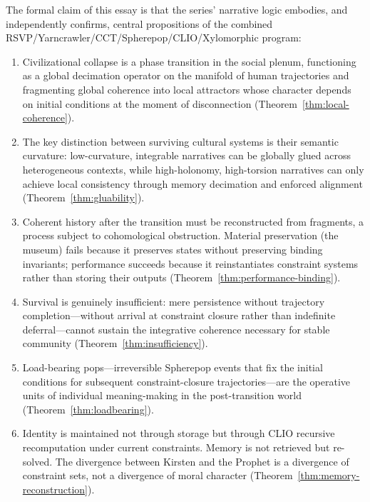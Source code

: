 \documentclass[12pt, oneside]{article}
\theoremstyle{plain}
\theoremstyle{definition}
\theoremstyle{remark}
\begin{document}
The formal claim of this essay is that the series' narrative logic
embodies, and independently confirms, central propositions of the
combined RSVP/Yarncrawler/CCT/Spherepop/CLIO/Xylomorphic program:

\begin{enumerate}
  \item Civilizational collapse is a phase transition in the social
  plenum, functioning as a global decimation operator on the
  manifold of human trajectories and fragmenting global coherence
  into local attractors whose character depends on initial conditions
  at the moment of disconnection (Theorem~\ref{thm:local-coherence}).

  \item The key distinction between surviving cultural systems is
  their semantic curvature: low-curvature, integrable narratives
  can be globally glued across heterogeneous contexts, while
  high-holonomy, high-torsion narratives can only achieve local
  consistency through memory decimation and enforced alignment
  (Theorem~\ref{thm:gluability}).

  \item Coherent history after the transition must be reconstructed
  from fragments, a process subject to cohomological obstruction.
  Material preservation (the museum) fails because it preserves
  states without preserving binding invariants; performance
  succeeds because it reinstantiates constraint systems rather than
  storing their outputs (Theorem~\ref{thm:performance-binding}).

  \item Survival is genuinely insufficient: mere persistence without
  trajectory completion---without arrival at constraint closure
  rather than indefinite deferral---cannot sustain the integrative
  coherence necessary for stable community
  (Theorem~\ref{thm:insufficiency}).

  \item Load-bearing pops---irreversible Spherepop events that fix
  the initial conditions for subsequent constraint-closure
  trajectories---are the operative units of individual meaning-making
  in the post-transition world (Theorem~\ref{thm:loadbearing}).

  \item Identity is maintained not through storage but through CLIO
  recursive recomputation under current constraints. Memory is not
  retrieved but re-solved. The divergence between Kirsten and the
  Prophet is a divergence of constraint sets, not a divergence of
  moral character (Theorem~\ref{thm:memory-reconstruction}).


\end{enumerate}
\end{document}

